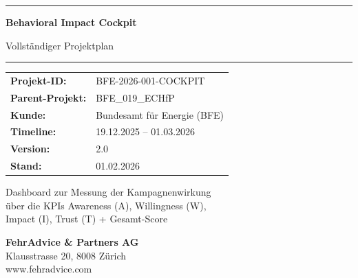 \documentclass[11pt,a4paper]{article}
\begin{document}
\begin{titlepage}
    \centering
    \vspace*{2cm}

    {\color{fadarkblue}\rule{\textwidth}{2pt}}

    \vspace{1cm}

    {\Huge\bfseries\color{fadarkblue} Behavioral Impact Cockpit}

    \vspace{0.5cm}

    {\LARGE\color{fadarkgray} Vollständiger Projektplan}

    \vspace{1cm}

    {\color{fadarkblue}\rule{\textwidth}{2pt}}

    \vspace{2cm}

    \begin{tcolorbox}[fabox, width=0.8\textwidth]
        \centering
        \begin{tabular}{ll}
            \textbf{Projekt-ID:} & BFE-2026-001-COCKPIT \\
            \textbf{Parent-Projekt:} & BFE\_019\_ECHfP \\
            \textbf{Kunde:} & Bundesamt für Energie (BFE) \\
            \textbf{Timeline:} & 19.12.2025 -- 01.03.2026 \\
            \textbf{Version:} & 2.0 \\
            \textbf{Stand:} & 01.02.2026 \\
        \end{tabular}
    \end{tcolorbox}

    \vspace{2cm}

    {\large\color{fadarkgray}
    Dashboard zur Messung der Kampagnenwirkung\\
    über die KPIs Awareness (A), Willingness (W),\\
    Impact (I), Trust (T) + Gesamt-Score
    }

    \vfill

    {\color{fadarkgray}
    \textbf{FehrAdvice \& Partners AG}\\
    Klausstrasse 20, 8008 Zürich\\
    www.fehradvice.com
    }

\end{titlepage}
\end{document}
